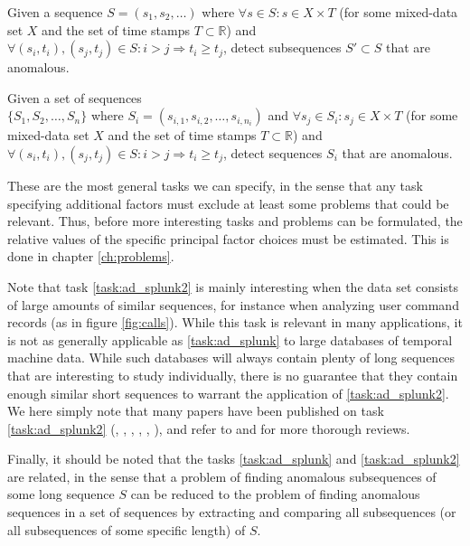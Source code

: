 \begin{task}
  \label{task:ad_splunk}
  Given a sequence $S = (s_1, s_2, \dots)$ where $\forall s \in S: s \in X \times T$ (for some mixed-data set $X$ and the set of time stamps $T \subset \mathbb{R}$) and $\forall (s_i, t_i), (s_j, t_j) \in S: i > j \Rightarrow t_i \geq t_j$, detect subsequences $S' \subset S$ that are anomalous. 
\end{task}
\begin{task}
  \label{task:ad_splunk2}
  Given a set of sequences\\ $\{S_1, S_2, \dots, S_n\}$ where $S_i = (s_{i,1}, s_{i,2}, \dots, s_{i, n_i})$ and $\forall s_j \in S_i: s_j \in X \times T$ (for some mixed-data set $X$ and the set of time stamps $T \subset \mathbb{R}$) and $\forall (s_i, t_i), (s_j, t_j) \in S: i > j \Rightarrow t_i \geq t_j$, detect sequences $S_i$ that are anomalous.
\end{task}

These are the most general tasks we can specify, in the sense that any task specifying additional factors must exclude at least some problems that could be relevant. Thus, before more interesting tasks and problems can be formulated, the relative values of the specific principal factor choices must be estimated. This is done in chapter \ref{ch:problems}.

Note that task \ref{task:ad_splunk2} is mainly interesting when the data set consists of large amounts of similar sequences, for instance when analyzing user command records (as in figure \ref{fig:calls}). While this task is relevant in many applications, it is not as generally applicable as \ref{task:ad_splunk} to large databases of temporal machine data. While such databases will always contain plenty of long sequences that are interesting to study individually, there is no guarantee that they contain enough similar short sequences to warrant the application of \ref{task:ad_splunk2}. We here simply note that many papers have been published on task \ref{task:ad_splunk2} (\cite{blender}, \cite{chan}, \cite{ye}, \cite{forrest}, \cite{sekar1}, \cite{sekar2}), and refer to \cite{chandola2} and \cite{chandola3} for more thorough reviews.

Finally, it should be noted that the tasks \ref{task:ad_splunk} and \ref{task:ad_splunk2} are related, in the sense that a problem of finding anomalous subsequences of some long sequence $S$ can be reduced to the problem of finding anomalous sequences in a set of sequences by extracting and comparing all subsequences (or all subsequences of some specific length) of $S$.

